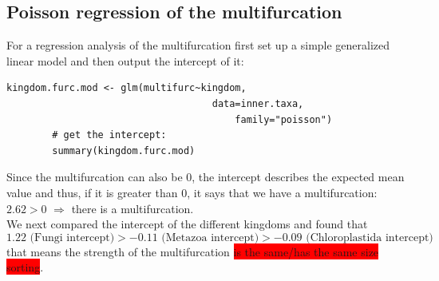     \subsection{Poisson regression of the multifurcation}
      For a regression analysis of the multifurcation first set up a simple generalized linear model and 
        then output the intercept of it:
      \lstset{language=R}
      \begin{lstlisting}[gobble=6]
        kingdom.furc.mod <- glm(multifurc~kingdom, 
                                    data=inner.taxa,
                                        family="poisson")
        # get the intercept:
        summary(kingdom.furc.mod)
      \end{lstlisting}
      Since the multifurcation can also be 0, the intercept describes the expected mean value and thus, 
        if it is greater than 0, it says that we have a multifurcation: $2.62 > 0$ $\Rightarrow$ there 
        is a multifurcation. \\
      We next compared the intercept of the different kingdoms and found that
        $$1.22 \text{ (Fungi intercept)} > -0.11 \text{ (Metazoa intercept)} > -0.09 \text{ (Chloroplastida intercept)}$$
        that means the strength of the multifurcation \colorbox{red}{is the same/has the same size 
        sorting}.  \\


